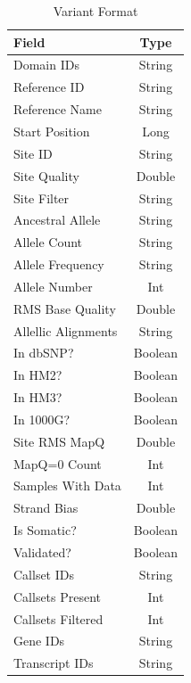\documentclass[10pt,twocolumn]{article}
\theoremstyle{plain}
\begin{document}
\begin{table}[h]
\caption{Variant Format}
\label{tab:variant-format}
\begin{center}
\begin{tabular}{| l | c |}
\hline
\bf Field & \bf Type \\
\hline
Domain IDs & String \\
Reference ID & String \\
Reference Name & String \\
Start Position & Long \\
Site ID & String \\
Site Quality & Double \\
Site Filter & String \\
Ancestral Allele & String \\
Allele Count & String \\
Allele Frequency & String \\
Allele Number & Int \\
RMS Base Quality & Double \\
Allellic Alignments & String \\
In dbSNP? & Boolean \\
In HM2? & Boolean \\
In HM3? & Boolean \\
In 1000G? & Boolean \\
Site RMS MapQ & Double \\
MapQ=0 Count & Int \\
Samples With Data & Int \\
Strand Bias & Double \\
Is Somatic? & Boolean \\
Validated? & Boolean \\
Callset IDs & String \\
Callsets Present & Int \\
Callsets Filtered & Int \\
Gene IDs & String \\
Transcript IDs & String \\
\hline
\end{tabular}
\end{center}
\end{table}
\end{document}
